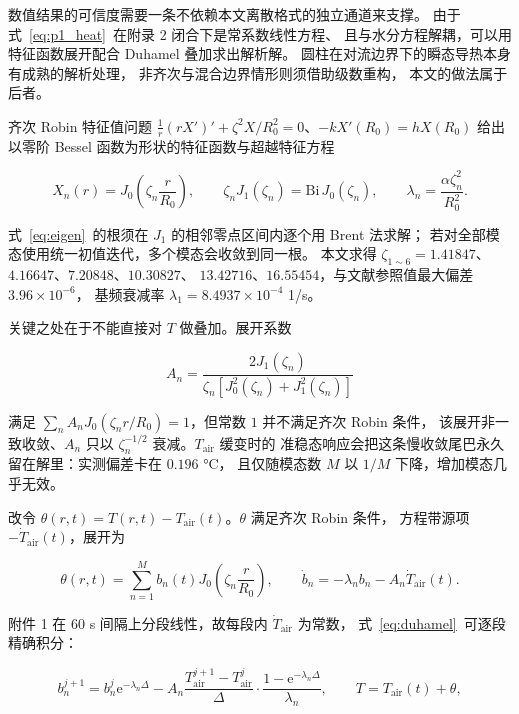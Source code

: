 数值结果的可信度需要一条不依赖本文离散格式的独立通道来支撑。
由于式~\eqref{eq:p1_heat}~在附录 2 闭合下是常系数线性方程、
且与水分方程解耦，可以用特征函数展开配合 Duhamel 叠加求出解析解。
圆柱在对流边界下的瞬态导热本身有成熟的解析处理，
非齐次与混合边界情形则须借助级数重构，
本文的做法属于后者。

齐次 Robin 特征值问题 $\frac{1}{r}(rX')'+\zeta^2X/R_0^2=0$、$-kX'(R_0)=hX(R_0)$
给出以零阶 Bessel 函数为形状的特征函数与超越特征方程

\begin{equation}
X_n(r)=J_0\!\left(\zeta_n\frac{r}{R_0}\right),
\qquad
\zeta_nJ_1(\zeta_n)=\mathrm{Bi}\,J_0(\zeta_n),
\qquad
\lambda_n=\frac{\alpha\zeta_n^{2}}{R_0^{2}}.
\label{eq:eigen}
\end{equation}

式~\eqref{eq:eigen}~的根须在 $J_1$ 的相邻零点区间内逐个用 Brent 法求解；
若对全部模态使用统一初值迭代，多个模态会收敛到同一根。
本文求得 $\zeta_{1\sim6}=1.41847$、$4.16647$、$7.20848$、$10.30827$、
$13.42716$、$16.55454$，与文献参照值最大偏差 $3.96\times10^{-6}$，
基频衰减率 $\lambda_1=8.4937\times10^{-4}$ 1/s。

关键之处在于不能直接对 $T$ 做叠加。展开系数

\begin{equation}
A_n=\frac{2J_1(\zeta_n)}{\zeta_n\left[J_0^{2}(\zeta_n)+J_1^{2}(\zeta_n)\right]}
\label{eq:An}
\end{equation}

满足 $\sum_nA_nJ_0(\zeta_nr/R_0)=1$，但常数 $1$ 并不满足齐次 Robin 条件，
该展开非一致收敛、$A_n$ 只以 $\zeta_n^{-1/2}$ 衰减。$T_{\mathrm{air}}$ 缓变时的
准稳态响应会把这条慢收敛尾巴永久留在解里：实测偏差卡在 $0.196$ °C，
且仅随模态数 $M$ 以 $1/M$ 下降，增加模态几乎无效。

改令 $\theta(r,t)=T(r,t)-T_{\mathrm{air}}(t)$。$\theta$ 满足齐次 Robin 条件，
方程带源项 $-\dot T_{\mathrm{air}}(t)$，展开为

\begin{equation}
\theta(r,t)=\sum_{n=1}^{M}b_n(t)J_0\!\left(\zeta_n\frac{r}{R_0}\right),
\qquad
\dot b_n=-\lambda_nb_n-A_n\dot T_{\mathrm{air}}(t).
\label{eq:duhamel}
\end{equation}

附件 1 在 $60$ s 间隔上分段线性，故每段内 $\dot T_{\mathrm{air}}$ 为常数，
式~\eqref{eq:duhamel}~可逐段精确积分：

\begin{equation}
b_n^{j+1}=b_n^{j}\mathrm{e}^{-\lambda_n\Delta}
-A_n\frac{T_{\mathrm{air}}^{j+1}-T_{\mathrm{air}}^{j}}{\Delta}
\cdot\frac{1-\mathrm{e}^{-\lambda_n\Delta}}{\lambda_n},
\qquad
T=T_{\mathrm{air}}(t)+\theta,
\label{eq:bn_exact}
\end{equation}

